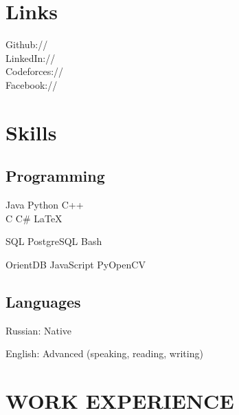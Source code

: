 \documentclass[]{deedy-resume-openfont}
\begin{document}
\begin{minipage}[t]{0.40\textwidth}

\section{Links}
\large
Github://\href{https://github.com/MaximCherchuk}{} \\
LinkedIn://\href{https://www.linkedin.com/in/maxim-cherchuk-6305aaa5/}{} \\
Codeforces://\href{http://codeforces.com/profile/MaxCherchuk}{} \\
Facebook://\href{https://www.facebook.com/profile.php?id=100004263036771}{}
\sectionsep

\end{minipage}
\begin{minipage}[t]{0.59\textwidth}

\section{Skills}
\subsection{Programming}
\large
Java \textbullet{} Python \textbullet{} C++\ \\
\sectionsep
{}
\large
C \textbullet{} C\# \textbullet{} \LaTeX \\
\sectionsep

\large
SQL \textbullet{} PostgreSQL \textbullet{} Bash
\sectionsep

\large
\textbullet{} OrientDB \textbullet{} JavaScript \textbullet{} PyOpenCV
\sectionsep

\subsection{Languages}
\vspace{\topsep}
\begin{tightemize}
\item Russian: Native
\item English: Advanced (speaking, reading, writing)
\end{tightemize}
\sectionsep
\end{minipage}

\section{WORK EXPERIENCE}
\end{document}
